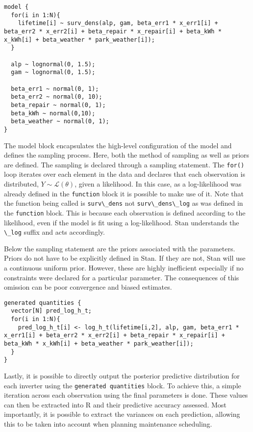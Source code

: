 \begin{lstlisting}
model {
  for(i in 1:N){
    lifetime[i] ~ surv_dens(alp, gam, beta_err1 * x_err1[i] + beta_err2 * x_err2[i] + beta_repair * x_repair[i] + beta_kWh * x_kWh[i] + beta_weather * park_weather[i]);
  }

  alp ~ lognormal(0, 1.5);
  gam ~ lognormal(0, 1.5);
  
  beta_err1 ~ normal(0, 1);
  beta_err2 ~ normal(0, 10);
  beta_repair ~ normal(0, 1);
  beta_kWh ~ normal(0,10);
  beta_weather ~ normal(0, 1);
}
\end{lstlisting}


The model block encapsulates the high-level configuration of the model and defines the sampling process. Here, both the method of sampling as well as priors are defined. The sampling is declared through a sampling statement. The \lstinline{for()} loop iterates over each element in the data and declares that each observation is distributed, $Y \sim \mathcal {L}(\theta)$,  given a likelihood. In this case, as a log-likelihood was already defined in the \lstinline{function} block it is possible to make use of it. Note that the function being called is \lstinline{surv\_dens} not \lstinline{surv\_dens\_log} as was defined in the \lstinline{function} block. This is because each observation is defined according to the likelihood, even if the model is fit using a log-likelihood. Stan understands the \lstinline{\_log} suffix and acts accordingly. 

Below the sampling statement are the priors associated with the parameters. Priors do not have to be explicitly defined in Stan. If they are not, Stan will use a continuous uniform prior. However, these are highly inefficient especially if no constraints were declared for a particular parameter. The consequences of this omission can be poor convergence and biased estimates. 



\begin{lstlisting}
generated quantities {
  vector[N] pred_log_h_t;
  for(i in 1:N){
    pred_log_h_t[i] <- log_h_t(lifetime[i,2], alp, gam, beta_err1 * x_err1[i] + beta_err2 * x_err2[i] + beta_repair * x_repair[i] + beta_kWh * x_kWh[i] + beta_weather * park_weather[i]);
  }
}
\end{lstlisting}

Lastly, it is possible to directly output the posterior predictive distribution for each inverter using the \lstinline{generated quantities} block. To achieve this, a simple iteration across each observation using the final parameters is done. These values can then be extracted into R and their predictive accuracy assessed. Most importantly, it is possible to extract the variances on each prediction, allowing this to be taken into account when planning maintenance scheduling. 

